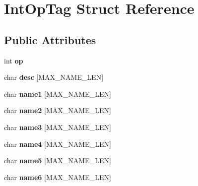 \hypertarget{struct_int_op_tag}{\section{Int\-Op\-Tag Struct Reference}
\label{struct_int_op_tag}
}
\subsection*{Public Attributes}
\begin{DoxyCompactItemize}
\item 
\hypertarget{struct_int_op_tag_a8fb14f9206116d7ab2399cfb29554278}{int {\bfseries op}}\label{struct_int_op_tag_a8fb14f9206116d7ab2399cfb29554278}

\item 
\hypertarget{struct_int_op_tag_a8f450f63bc63a7d2e378eace55c240bf}{char {\bfseries desc} \mbox{[}M\-A\-X\-\_\-\-N\-A\-M\-E\-\_\-\-L\-E\-N\mbox{]}}\label{struct_int_op_tag_a8f450f63bc63a7d2e378eace55c240bf}

\item 
\hypertarget{struct_int_op_tag_a56eba35f7963afa384fd717dca544d44}{char {\bfseries name1} \mbox{[}M\-A\-X\-\_\-\-N\-A\-M\-E\-\_\-\-L\-E\-N\mbox{]}}\label{struct_int_op_tag_a56eba35f7963afa384fd717dca544d44}

\item 
\hypertarget{struct_int_op_tag_ab20020d0b1bcfa3f9db63798ace3a28b}{char {\bfseries name2} \mbox{[}M\-A\-X\-\_\-\-N\-A\-M\-E\-\_\-\-L\-E\-N\mbox{]}}\label{struct_int_op_tag_ab20020d0b1bcfa3f9db63798ace3a28b}

\item 
\hypertarget{struct_int_op_tag_a113837fdacb56a5f3d1d463ae30a0cbf}{char {\bfseries name3} \mbox{[}M\-A\-X\-\_\-\-N\-A\-M\-E\-\_\-\-L\-E\-N\mbox{]}}\label{struct_int_op_tag_a113837fdacb56a5f3d1d463ae30a0cbf}

\item 
\hypertarget{struct_int_op_tag_ad2100e7f4c1f941febbf1bd507542351}{char {\bfseries name4} \mbox{[}M\-A\-X\-\_\-\-N\-A\-M\-E\-\_\-\-L\-E\-N\mbox{]}}\label{struct_int_op_tag_ad2100e7f4c1f941febbf1bd507542351}

\item 
\hypertarget{struct_int_op_tag_abde7fa039b9871c3714e6c07a607ec7f}{char {\bfseries name5} \mbox{[}M\-A\-X\-\_\-\-N\-A\-M\-E\-\_\-\-L\-E\-N\mbox{]}}\label{struct_int_op_tag_abde7fa039b9871c3714e6c07a607ec7f}

\item 
\hypertarget{struct_int_op_tag_a8549bc7df9ed51b131ac7624a83203a3}{char {\bfseries name6} \mbox{[}M\-A\-X\-\_\-\-N\-A\-M\-E\-\_\-\-L\-E\-N\mbox{]}}\label{struct_int_op_tag_a8549bc7df9ed51b131ac7624a83203a3}


\end{DoxyCompactItemize}
